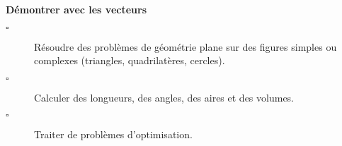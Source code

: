 \begin{titre}

\end{titre}

\begin{CpsCol}
\textbf{Démontrer avec les vecteurs}
\begin{description}
\item[$\square$] Résoudre des problèmes de géométrie plane sur des figures simples ou complexes
(triangles, quadrilatères, cercles).
\item[$\square$] Calculer des longueurs, des angles, des aires et des volumes.
\item[$\square$] Traiter de problèmes d’optimisation. 
\end{description}
\end{CpsCol}



